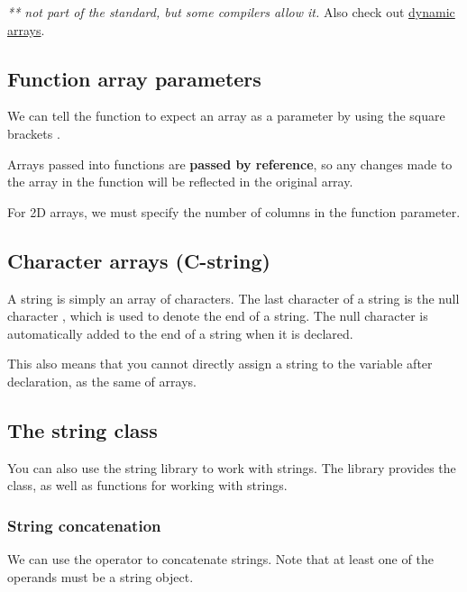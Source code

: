 \documentclass{article}
\begin{document}
\emph{** not part of the standard, but some compilers allow it.} Also check out \hyperref[sec:dynamicarrays]{dynamic arrays}.



\subsection{Function array parameters}
We can tell the function to expect an array as a parameter by using the square brackets .

Arrays passed into functions are \textbf{passed by reference}, so any changes made to the array in the function will be reflected in the original array.

For 2D arrays, we must specify the number of columns in the function parameter.


\subsection{Character arrays (C-string)}
A string is simply an array of characters. The last character of a string is the null character , which is used to denote the end of a string. The null character is automatically added to the end of a string when it is declared.

This also means that you cannot directly assign a string to the variable after declaration, as the same of arrays.


\subsection{The string class}
You can also use the string library to work with strings. The library provides the class, as well as functions for working with strings.

\subsubsection{String concatenation}
We can use the  operator to concatenate strings. Note that at least one of the operands must be a string object.

\end{document}
